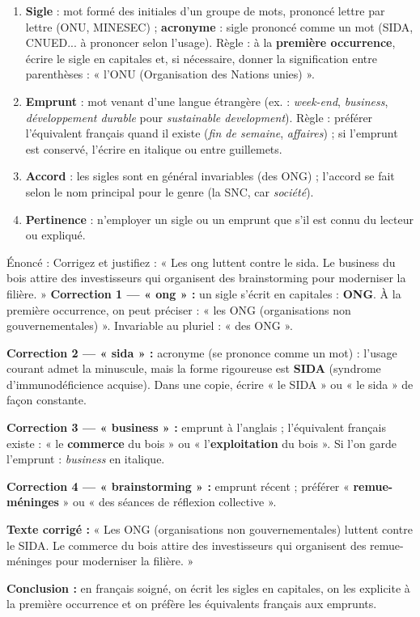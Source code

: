 \documentclass[11pt]{article}
\newcounter{popsec}
\newcounter{popsub}
\newcommand{\courssub}[1]{%
  \stepcounter{popsub}%
  \par\vspace{9pt}\noindent{\popxbold\fontsize{11.5}{13}\selectfont\color{popink}{\color{poporange}\thepopsec.\thepopsub}\hspace{6pt}#1}\par\nopagebreak\vspace{4pt}
}
\begin{document}
\courssub{Sigles et emprunts : les employer correctement}

\begin{methode}
\begin{enumerate}
\item \textbf{Sigle} : mot formé des initiales d'un groupe de mots, prononcé lettre par lettre (ONU, MINESEC) ; \textbf{acronyme} : sigle prononcé comme un mot (SIDA, CNUED... à prononcer selon l'usage). Règle : à la \textbf{première occurrence}, écrire le sigle en capitales et, si nécessaire, donner la signification entre parenthèses : « l'ONU (Organisation des Nations unies) ».
\item \textbf{Emprunt} : mot venant d'une langue étrangère (ex. : \emph{week-end}, \emph{business}, \emph{développement durable} pour \emph{sustainable development}). Règle : préférer l'équivalent français quand il existe (\emph{fin de semaine}, \emph{affaires}) ; si l'emprunt est conservé, l'écrire en italique ou entre guillemets.
\item \textbf{Accord} : les sigles sont en général invariables (des ONG) ; l'accord se fait selon le nom principal pour le genre (la SNC, car \emph{société}).
\item \textbf{Pertinence} : n'employer un sigle ou un emprunt que s'il est connu du lecteur ou expliqué.
\end{enumerate}
\end{methode}

\begin{exoresolu}
Énoncé : Corrigez et justifiez : « Les ong luttent contre le sida. Le business du bois attire des investisseurs qui organisent des brainstorming pour moderniser la filière. »
\tcblower
\textbf{Correction 1 — « ong » :} un sigle s'écrit en capitales : \textbf{ONG}. À la première occurrence, on peut préciser : « les ONG (organisations non gouvernementales) ». Invariable au pluriel : « des ONG ».

\textbf{Correction 2 — « sida » :} acronyme (se prononce comme un mot) : l'usage courant admet la minuscule, mais la forme rigoureuse est \textbf{SIDA} (syndrome d'immunodéficience acquise). Dans une copie, écrire « le SIDA » ou « le sida » de façon constante.

\textbf{Correction 3 — « business » :} emprunt à l'anglais ; l'équivalent français existe : « le \textbf{commerce} du bois » ou « l'\textbf{exploitation} du bois ». Si l'on garde l'emprunt : \emph{business} en italique.

\textbf{Correction 4 — « brainstorming » :} emprunt récent ; préférer « \textbf{remue-méninges} » ou « des séances de réflexion collective ».

\textbf{Texte corrigé :} « Les ONG (organisations non gouvernementales) luttent contre le SIDA. Le commerce du bois attire des investisseurs qui organisent des remue-méninges pour moderniser la filière. »

\textbf{Conclusion :} en français soigné, on écrit les sigles en capitales, on les explicite à la première occurrence et on préfère les équivalents français aux emprunts.
\end{exoresolu}
\end{document}
